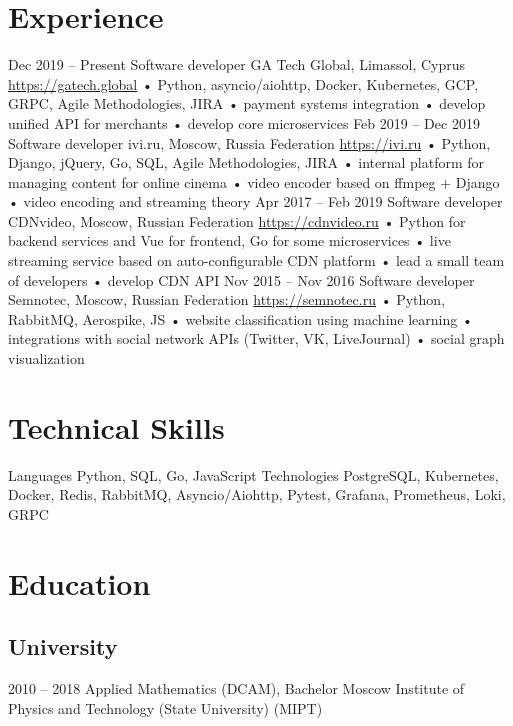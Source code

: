 \documentclass[12pt,a4paper]{moderncv}
\begin{document}
\maketitle

\section{Experience}
\cventry
  {Dec 2019 – Present}
  {Software developer}
  {GA Tech Global, Limassol, Cyprus}
  {\newline{}\url{https://gatech.global}}{}
  {
    • Python, asyncio/aiohttp, Docker, Kubernetes, GCP, GRPC, Agile Methodologies, JIRA\newline{}
    • payment systems integration\newline{}
    • develop unified API for merchants\newline{}
    • develop core microservices
  }
\cventry
  {Feb 2019 – Dec 2019}
  {Software developer}
  {ivi.ru, Moscow, Russia Federation}
  {\newline{}\url{https://ivi.ru}}{}
  {
    • Python, Django, jQuery, Go, SQL, Agile Methodologies, JIRA\newline{}
    • internal platform for managing content for online cinema\newline{}
    • video encoder based on ffmpeg + Django\newline{}
    • video encoding and streaming theory
   }
\cventry
  {Apr 2017 – Feb 2019}
  {Software developer}
  {CDNvideo, Moscow, Russian Federation}
  {\newline{}\url{https://cdnvideo.ru}}{}
  {
    • Python for backend services and Vue for frontend, Go for some microservices\newline{}
    • live streaming service based on auto-configurable CDN platform\newline{}
    • lead a small team of developers\newline{}
    • develop CDN API
   }
\cventry
  {Nov 2015 – Nov 2016}
  {Software developer}
  {Semnotec, Moscow, Russian Federation}
  {\newline{}\url{https://semnotec.ru}}{}
  {
    • Python, RabbitMQ, Aerospike, JS\newline{}
    • website classification using machine learning\newline{}
    • integrations with social network APIs (Twitter, VK, LiveJournal)\newline{}
    • social graph visualization
   }

\section{Technical Skills}
\cvline
  {Languages}{
    Python,
    SQL,
    Go,
    JavaScript
  }
\cvline
  {Technologies}{
    PostgreSQL,
    Kubernetes,
    Docker,
    Redis,
    RabbitMQ,
    Asyncio/Aiohttp,
    Pytest,
    Grafana,
    Prometheus,
    Loki,
    GRPC
  }

\section{Education}
  \subsection{University}
  \cventry
    {2010 – 2018}
    {Applied Mathematics (DCAM), Bachelor}
    {Moscow Institute of Physics and Technology (State University) (MIPT)}
    {}{}{}
\end{document}
